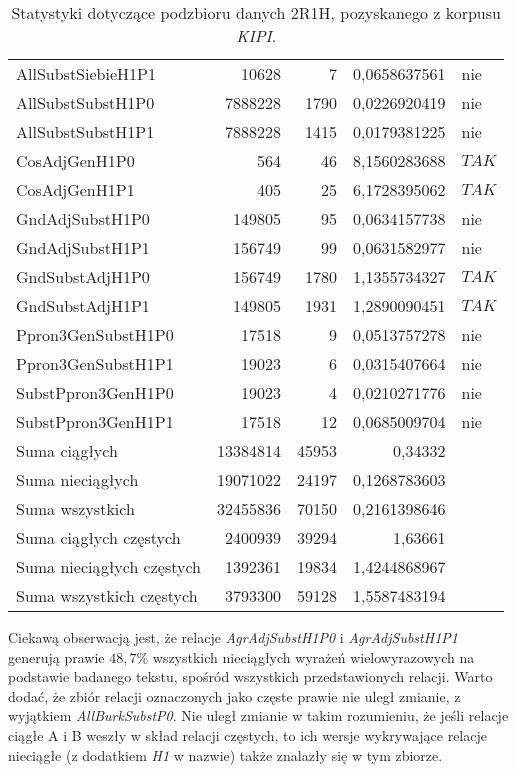 \begin{table}[h!]
\begin{tabular}{ l | r | r | r | l }
	AllSubstSiebieH1P1	&	10628	&	7	&	0,0658637561	&	nie	\\
	AllSubstSubstH1P0	&	7888228	&	1790	&	0,0226920419	&	nie	\\
	AllSubstSubstH1P1	&	7888228	&	1415	&	0,0179381225	&	nie	\\
	CosAdjGenH1P0	&	564	&	46	&	8,1560283688	&	$ TAK $	\\
	CosAdjGenH1P1	&	405	&	25	&	6,1728395062	&	$ TAK $	\\
	GndAdjSubstH1P0	&	149805	&	95	&	0,0634157738	&	nie	\\
	GndAdjSubstH1P1	&	156749	&	99	&	0,0631582977	&	nie	\\
	GndSubstAdjH1P0	&	156749	&	1780	&	1,1355734327	&	$ TAK $	\\
	GndSubstAdjH1P1	&	149805	&	1931	&	1,2890090451	&	$ TAK $	\\
	Ppron3GenSubstH1P0	&	17518	&	9	&	0,0513757278	&	nie	\\
	Ppron3GenSubstH1P1	&	19023	&	6	&	0,0315407664	&	nie	\\
	SubstPpron3GenH1P0	&	19023	&	4	&	0,0210271776	&	nie	\\
	SubstPpron3GenH1P1	&	17518	&	12	&	0,0685009704	&	nie	\\
	\midrule									
	Suma ciągłych	&	13384814	&	45953	&	0,34332	&		\\
	Suma nieciągłych	&	19071022	&	24197	&	0,1268783603	&		\\
	Suma wszystkich	&	32455836	&	70150	&	0,2161398646	&		\\
	Suma ciągłych częstych	&	2400939	&	39294	&	1,63661	&		\\
	Suma nieciągłych częstych	&	1392361	&	19834	&	1,4244868967	&		\\
	Suma wszystkich częstych	&	3793300	&	59128	&	1,5587483194	&		\\
	\bottomrule
\end{tabular}
\caption[Statystyki podzbioru danych \emph{KIPI} 2R1H]{Statystyki dotyczące podzbioru danych 2R1H, pozyskanego z korpusu \emph{KIPI}.}
\label{KIPI_2R1H_stats}
\end{table}

\par
Ciekawą obserwacją jest, że relacje \emph{AgrAdjSubstH1P0} i \emph{AgrAdjSubstH1P1} generują prawie $ 48,7\% $ wszystkich nieciągłych wyrażeń wielowyrazowych na podstawie badanego tekstu, spośród wszystkich przedstawionych relacji.
Warto dodać, że zbiór relacji oznaczonych jako częste prawie nie uległ zmianie, z wyjątkiem \emph{AllBurkSubstP0}.
Nie uległ zmianie w takim rozumieniu, że jeśli relacje ciągłe A i B weszły w skład relacji częstych, to ich wersje wykrywające relacje nieciągłe (z dodatkiem \emph{H1} w nazwie) także znalazły się w tym zbiorze.

